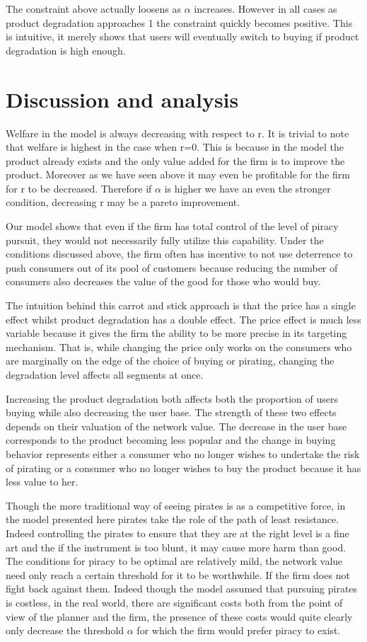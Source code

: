 \documentclass{article}
\begin{document}
The constraint above actually loosens as $\alpha$ increases. However in all cases as product degradation approaches 1 the constraint quickly becomes positive. This is intuitive, it merely shows that users will eventually switch to buying if product degradation is high enough. 

\section{Discussion and analysis}

Welfare in the model is always decreasing with respect to r. It is trivial to note that welfare is highest in the case when r=0. This is because in the model the product already exists and the only value added for the firm is to improve the product. Moreover as we have seen above it may even be profitable for the firm for r to be decreased. Therefore if $\alpha$ is higher we have an even the stronger condition, decreasing r may be a pareto improvement. 

Our model shows that even if the firm has total control of the level of piracy pursuit, they would not necessarily fully utilize this capability. Under the conditions discussed above, the firm often has incentive to not use deterrence to push consumers out of its pool of customers because reducing the number of consumers also decreases the value of the good for those who would buy. 

The intuition behind this carrot and stick approach is that the price has a single effect whilst product degradation has a double effect. The price effect is much less variable because it gives the firm the ability to be more precise in its targeting mechanism. That is, while changing the price only works on the consumers who are marginally on the edge of the choice of buying or pirating, changing the degradation level affects all segments at once. 

Increasing the product degradation both affects both the proportion of users buying while also decreasing the user base. The strength of these two effects depends on their valuation of the network value. The decrease in the user base corresponds to the product becoming less popular and the change in buying behavior represents either a consumer who no longer wishes to undertake the risk of pirating or a consumer who no longer wishes to buy the product because it has less value to her.

Though the more traditional way of seeing pirates is as a competitive force, in the model presented here pirates take the role of the path of least resistance. Indeed controlling the pirates to ensure that they are at the right level is a fine art and the if the instrument is too blunt, it may cause more harm than good. The conditions for piracy to be optimal are relatively mild, the network value need only reach a certain threshold for it to be worthwhile. If the firm does not fight back against them. Indeed though the model assumed that pursuing pirates is costless, in the real world, there are significant costs both from the point of view of the planner and the firm, the presence of these costs would quite clearly only decrease the threshold $\alpha$ for which the firm would prefer piracy to exist. 
\end{document}
